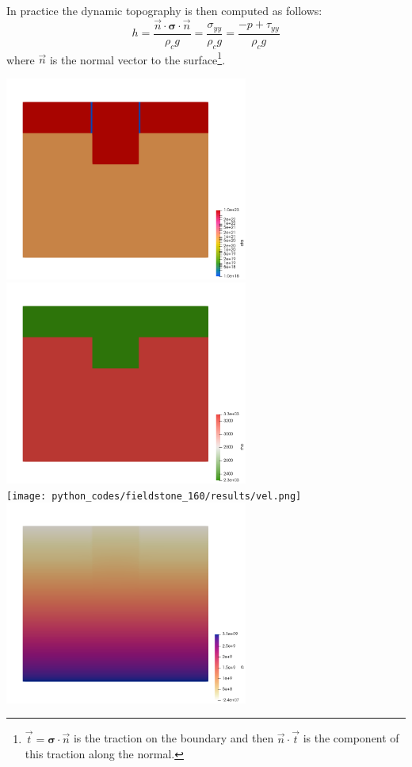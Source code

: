In practice the dynamic topography is then computed as follows: 
\[
h= \frac{\vec{n} \cdot {\bm \sigma}\cdot \vec{n}}{\rho_c g } 
= \frac{\sigma_{yy}}{\rho_c g}
= \frac{-p+\tau_{yy}}{\rho_c g}
\]
where $\vec{n}$ is the normal vector to the surface\footnote{$\vec{t} ={\bm\sigma}\cdot \vec{n}$ 
is the traction on the boundary and then $\vec n \cdot \vec t$ is the component of this traction
along the normal.}. 


\begin{center}
\includegraphics[width=8cm]{python_codes/fieldstone_160/results/eta.png}
\includegraphics[width=8cm]{python_codes/fieldstone_160/results/rho.png}\\
\texttt{[image: python\_codes/fieldstone\_160/results/vel.png]}
\includegraphics[width=8cm]{python_codes/fieldstone_160/results/press.png}\\

\end{center}
